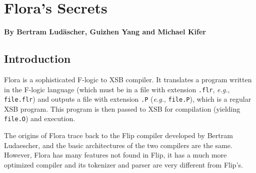 \documentclass[11pt]{report}
\begin{document}
\newcommand{\FdConstr}{\ensuremath{\stackrel{constr}{\Fd}}}
\newcommand{\MvdConstr}{\ensuremath{\stackrel{constr}{\Mvd}}}

\newlength{\flogicindent}


\newlength{\flength}
\newlength{\counterlength}


\newcommand{\la}{\ensuremath{\,\leftarrow\,}}

\newcommand{\anon}{\_}

\newcommand{\note}[1]{\textit{[[#1]]}}
\newcommand{\nterm}[1]{\ensuremath{\langle}\textit{#1}\ensuremath{\rangle}}



\newcommand{\bs}{\ensuremath{\backslash}}
\newcommand{\FLIP}{{\mbox{\sc Flip}}\xspace}
\newcommand{\FLORA}{{\mbox{\sc Flora}}\xspace}
\newcommand{\FLORID}{{\mbox{\sc Florid}}\xspace}
\newcommand{\fl}{{F-logic}\xspace}


\newcommand{\consts}{\ensuremath{\mathcal{C}}}
\newcommand{\funcs}{\ensuremath{\mathcal{F}}}
\newcommand{\preds}{\ensuremath{\mathcal{P}}}
\newcommand{\vars}{\ensuremath{\mathcal{V}}}

\newcommand{\HU}{\ensuremath{U}}
\newcommand{\HB}{\ensuremath{\mathcal{HB}}}
\newcommand{\ext}{\ensuremath{^{\star}}}

\newcommand{\bksl}{\symbol{92}}
\newcommand{\dq}{\symbol{34}}


\chapter{\FLORA's Secrets}

\begin{center}
{\Large {\bf By Bertram Lud\"ascher, Guizhen Yang and Michael Kifer}}
\end{center}

\section{Introduction}

\FLORA is a sophisticated F-logic to XSB compiler. It translates a program
written in the F-logic language \cite{KLW95} (which must be in a file with
extension {\tt .flr}, {\it e.g.}, {\tt file.flr}) and outputs a file with
extension {\tt .P} ({\it e.g.}, {\tt file.P}), which is a regular XSB
program. This program is then passed to XSB for compilation (yielding {\tt
  file.O}) and execution.

The origins of \FLORA trace back to the \FLIP compiler developed by Bertram
Ludaescher, and the basic architectures of the two compilers are the same.
However, \FLORA has many features not found in \FLIP, it has a much more
optimized compiler and its tokenizer and parser are very different from
\FLIP's.
\end{document}
